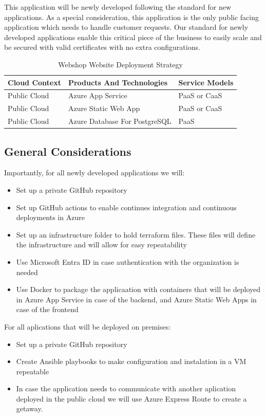 \documentclass{llncs}
\begin{document}
This application will be newly developed following the standard for new applications.
As a special consideration, this application is the only public facing application which needs to handle customer requests.
Our standard for newly developed applications enable this critical piece of the business to easily scale and be secured with valid certificates with no extra configurations.\\

\begin{table}[h!]
    \centering
    \begin{tabular}{lll}
        \hline
        \textbf{Cloud Context} & \textbf{Products And Technologies} & \textbf{Service Models} \\
        \hline
        Public Cloud           & Azure App Service                  & PaaS or CaaS            \\
        \hline
        Public Cloud           & Azure Static Web App               & PaaS or CaaS            \\
        \hline
        Public Cloud           & Azure Database For PostgreSQL      & PaaS                    \\
        \hline
    \end{tabular}
    \caption{Webshop Website Deployment Strategy}
\end{table}

\subsection{General Considerations}

Importantly, for all newly developed applications we will:
\begin{itemize}
    \item Set up a private GitHub repository
    \item Set up GitHub actions to enable continues integration and continuous deployments in Azure
    \item Set up an infrastructure folder to hold terraform files. These files will define the infrastructure and will allow for easy repeatability
    \item Use Microsoft Entra ID in case authentication with the organization is needed
    \item Use Docker to package the applicaation with containers that will be deployed in Azure App Service in case of the backend, and Azure Static Web Apps in case of the frontend
\end{itemize}
For all aplications that will be deployed on premises:
\begin{itemize}
    \item Set up a private GitHub repository
    \item Create Ansible playbooks to make configuration and instalation in a VM repeatable
    \item In case the application needs to communicate with another aplication deployed in the public cloud we will use Azure Express Route to create a getaway.
\end{itemize}
\end{document}
